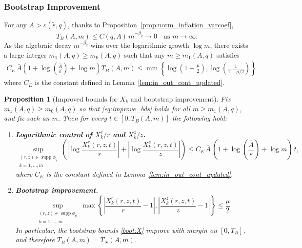 \documentclass[reqno,11pt]{amsart}
\newtheorem{proposition}[theorem]{Proposition}
\newcommand{\supp}{\operatorname{supp}}
\begin{document}
\subsubsection{Bootstrap Improvement}
For any $A>\varepsilon(\tilde \varepsilon,q)$, thanks to Proposition~\ref{prop:norm_inflation_varcoef}, 
\[
T_B(A,m)\leq C(q,A)\, m^{-\beta_q}\to 0 \quad  \text{as }m\to\infty.
\]
As the algebraic decay $m^{-\beta_q}$ wins over the logarithmic growth $\log m$, there exists a large integer $m_1(A,q)\geq m_0(A,q)$ such that any $m\geq m_1(A,q)$ satisfies 
    \begin{align}
    \label{eq:improve_bds}
        C_E \, \bar A \left( 1 + \log\left(\frac{\bar A}{\varepsilon}\right) + \log m \right)T_B(A,m)
        \leq 
        \min\left\{ \log \left( 1+\frac{\mu}{2}\right), \log \left(\frac{1}{1-\mu/2} \right) \right\}
    \end{align}
where $C_E$ is the constant defined in Lemma~\ref{lem:in_out_cont_updated}.
\begin{proposition}[Improved bounds for $X_k$ and bootstrap improvement]\label{lem:Euler_close_bootstrap_X_DY}
Fix $m_1(A,q)\geq m_0(A,q)$ so that \eqref{eq:improve_bds} holds for all $m\geq m_1(A,q)$, and fix such an $m$.
Then for every $t\in[0,T_B(A,m)]$ the following hold:
\begin{enumerate}
\item[(i)] \textbf{Logarithmic control of $X_k^r/r$ and $X_k^z/z$.} 
\begin{equation}\label{eq:log_control_X}
\sup_{\substack{(r,z)\in \supp \phi_q \\ k=1,\ldots,m}}\left(
\left|\log\frac{X_k^r(r,z,t)}{r}\right|
+\left|\log\frac{X_k^z(r,z,t)}{z}\right|
\right)
\le C_E\,\bar A\, \left( 1 + \log\left(\frac{\bar A}{\varepsilon}\right) + \log m \right)\,t,
\end{equation}
where $C_E$ is the constant defined in Lemma~\ref{lem:in_out_cont_updated}.
\item[(ii)] \textbf{Bootstrap improvement.} 
\[
    \sup_{\substack{(r,z)\in \supp \phi_q\\ k=1,\ldots,m}}
    \max\left\{
    \left| \frac{X_k^r(r,z,t)}{r}-1\right|,
    \left|\frac{X_k^z(r,z,t)}{z}-1\right|
    \right\}
    \leq \frac{\mu}{2}
\]
In particular, the bootstrap bounds \eqref{boot:X} improve with margin on $[0,T_B]$, and therefore $T_B(A,m)=T_N(A,m)$.
\end{enumerate}
\end{proposition}
\end{document}

